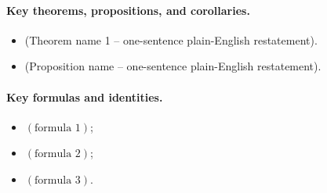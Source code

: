 \paragraph{Key theorems, propositions, and corollaries.}
\begin{itemize}
    \item (Theorem name 1 -- one-sentence plain-English restatement).
    \item (Proposition name -- one-sentence plain-English restatement).
\end{itemize}

\paragraph{Key formulas and identities.}
\begin{itemize}
    \item \((\text{formula 1})\);
    \item \((\text{formula 2})\);
    \item \((\text{formula 3})\).
\end{itemize}

